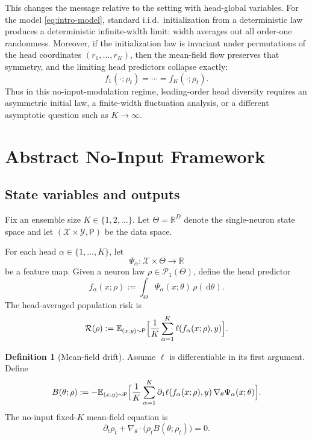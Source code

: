 \documentclass[11pt]{article}
\theoremstyle{definition}
\newtheorem{definition}[theorem]{Definition}
\newcommand{\R}{\mathbb{R}}
\newcommand{\E}{\mathbb{E}}
\newcommand{\PP}{\mathcal{P}}
\newcommand{\dd}{\,\mathrm{d}}
\begin{document}
This changes the message relative to the setting with head-global variables.
For the model \eqref{eq:intro-model}, standard i.i.d.\ initialization from a
deterministic law produces a deterministic infinite-width limit: width averages
out all order-one randomness. Moreover, if the initialization law is invariant
under permutations of the head coordinates $(r_1,\dots,r_K)$, then the mean-field
flow preserves that symmetry, and the limiting head predictors collapse exactly:
\[
  f_1(\cdot;\rho_t)=\cdots=f_K(\cdot;\rho_t).
\]
Thus in this no-input-modulation regime, leading-order head diversity requires an
asymmetric initial law, a finite-width fluctuation analysis, or a different
asymptotic question such as $K\to\infty$.

\section{Abstract No-Input Framework}

\subsection{State variables and outputs}

Fix an ensemble size $K\in\{1,2,\dots\}$. Let $\Theta=\R^D$ denote the single-neuron
state space and let $(\mathcal X\times\mathcal Y,\mathsf P)$ be the data space.

For each head $\alpha\in\{1,\dots,K\}$, let
\[
  \Psi_\alpha:\mathcal X\times\Theta\to\R
\]
be a feature map. Given a neuron law $\rho\in\PP_1(\Theta)$, define the head
predictor
\begin{equation}
  f_\alpha(x;\rho)
  :=
  \int_\Theta \Psi_\alpha(x;\theta)\,\rho(\dd\theta).
  \label{eq:output}
\end{equation}
The head-averaged population risk is
\begin{equation}
  \mathcal R(\rho)
  :=
  \E_{(x,y)\sim\mathsf P}
  \Bigl[
    \frac1K\sum_{\alpha=1}^K \ell(f_\alpha(x;\rho),y)
  \Bigr].
  \label{eq:risk}
\end{equation}

\begin{definition}[Mean-field drift]
Assume $\ell$ is differentiable in its first argument. Define
\begin{equation}
  B(\theta;\rho)
  :=
  -\E_{(x,y)\sim\mathsf P}
  \Bigl[
    \frac1K\sum_{\alpha=1}^K
    \partial_1\ell(f_\alpha(x;\rho),y)\,
    \nabla_\theta \Psi_\alpha(x;\theta)
  \Bigr].
  \label{eq:drift}
\end{equation}
The no-input fixed-$K$ mean-field equation is
\begin{equation}
  \partial_t \rho_t
  +
  \nabla_\theta\cdot\bigl(\rho_t B(\theta;\rho_t)\bigr)
  =
  0.
  \label{eq:pde}
\end{equation}
\end{definition}
\end{document}
